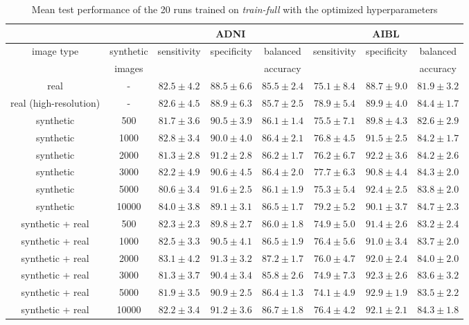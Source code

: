 \documentclass[10pt,journal,compsoc]{IEEEtran}
\begin{document}
\begin{table*}[ht]
 \caption{Mean test performance of the 20 runs trained on \textit{train-full} with the optimized hyperparameters}
 \label{table: app train-full_random}
\centering
\scriptsize
  \begin{tabular}{|c|c||c|c|c||c|c|c|}
    \cline{3-8}
    \multicolumn{2}{c|}{} & \multicolumn{3}{c||}{ADNI} & \multicolumn{3}{c|}{AIBL} \\
    \hline
    \multirow{2}{*}{image type} & synthetic & \multirow{2}{*}{sensitivity} & \multirow{2}{*}{specificity} & balanced & \multirow{2}{*}{sensitivity} & \multirow{2}{*}{specificity} & balanced\\
    & images & & & accuracy & & & accuracy\\
    \hline
    \hline
    real & - & $82.5\pm4.2$ & $88.5\pm6.6$ & $85.5\pm2.4$ & $75.1\pm8.4$ & $88.7\pm9.0$ & $81.9\pm3.2$ \\
    real (high-resolution) & - & $82.6\pm4.5$ & $88.9\pm6.3$ & $85.7\pm2.5$ & $78.9\pm5.4$ & $89.9\pm4.0$ & $84.4\pm1.7$ \\
    \hline
    synthetic & 500 & $81.7\pm3.6$ & $90.5\pm3.9$ & $86.1\pm1.4$ & $75.5\pm7.1$ & $89.8\pm4.3$ & $82.6\pm2.9$ \\
    synthetic & 1000 & $82.8\pm3.4$ & $90.0\pm4.0$ & $86.4\pm2.1$ & $76.8\pm4.5$ & $91.5\pm2.5$ & $84.2\pm1.7$ \\
    synthetic & 2000 & $81.3\pm2.8$ & $91.2\pm2.8$ & $86.2\pm1.7$ & $76.2\pm6.7$ & $\boldsymbol{92.2\pm3.6}$ & $84.2\pm2.6$ \\
    synthetic & 3000 & $82.2\pm4.9$ & $90.6\pm4.5$ & $86.4\pm2.0$ & $77.7\pm6.3$ & $90.8\pm4.4$ & $84.3\pm2.0$ \\
    synthetic & 5000 & $80.6\pm3.4$ & $\boldsymbol{91.6\pm2.5}$ & $86.1\pm1.9$ & $75.3\pm5.4$ & $92.4\pm2.5$ & $83.8\pm2.0$ \\
    synthetic & 10000 & $\boldsymbol{84.0\pm3.8}$ & $89.1\pm3.1$ & $\boldsymbol{86.5\pm1.7}$ & $\boldsymbol{79.2\pm5.2}$ & $90.1\pm3.7$ & $\boldsymbol{84.7\pm2.3}$ \\
    \hline
    synthetic + real & 500 & $82.3\pm2.3$ & $89.8\pm2.7$ & $86.0\pm1.8$ & $74.9\pm5.0$ & $91.4\pm2.6$ & $83.2\pm2.4$ \\
    synthetic + real & 1000 & $82.5\pm3.3$ & $90.5\pm4.1$ & $86.5\pm1.9$ & $76.4\pm5.6$ & $91.0\pm3.4$ & $83.7\pm2.0$ \\
    synthetic + real & 2000 & $\boldsymbol{83.1\pm4.2}$ & $\boldsymbol{91.3\pm3.2}$ & $\boldsymbol{87.2\pm1.7}$ & $76.0\pm4.7$ & $92.0\pm2.4$ & $84.0\pm2.0$ \\
    synthetic + real & 3000 & $81.3\pm3.7$ & $90.4\pm3.4$ & $85.8\pm2.6$ & $74.9\pm7.3$ & $92.3\pm2.6$ & $83.6\pm3.2$ \\
    synthetic + real & 5000 & $81.9\pm3.5$ & $90.9\pm2.5$ & $86.4\pm1.3$ & $74.1\pm4.9$ & $\boldsymbol{92.9\pm1.9}$ & $83.5\pm2.2$ \\
    synthetic + real & 10000 & $82.2\pm3.4$ & $91.2\pm3.6$ & $86.7\pm1.8$ & $\boldsymbol{76.4\pm4.2}$ & $92.1\pm2.1$ & $\boldsymbol{84.3\pm1.8}$ \\
    \hline
  \end{tabular}%
\end{table*}
\end{document}
